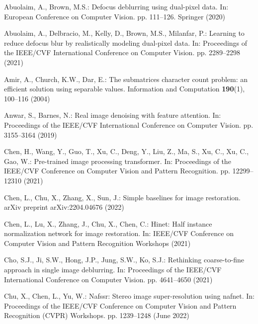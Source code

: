 \documentclass[runningheads]{llncs}
\begin{document}

\begin{thebibliography}{10}
\providecommand{\url}[1]{\texttt{#1}}
\providecommand{\urlprefix}{URL }
\providecommand{\doi}[1]{https://doi.org/#1}

Abuolaim, A., Brown, M.S.: Defocus deblurring using dual-pixel data. In:
  European Conference on Computer Vision. pp. 111--126. Springer (2020)

Abuolaim, A., Delbracio, M., Kelly, D., Brown, M.S., Milanfar, P.: Learning to
  reduce defocus blur by realistically modeling dual-pixel data. In:
  Proceedings of the IEEE/CVF International Conference on Computer Vision. pp.
  2289--2298 (2021)

Amir, A., Church, K.W., Dar, E.: The submatrices character count problem: an
  efficient solution using separable values. Information and Computation
  \textbf{190}(1),  100--116 (2004)

Anwar, S., Barnes, N.: Real image denoising with feature attention. In:
  Proceedings of the IEEE/CVF International Conference on Computer Vision. pp.
  3155--3164 (2019)

Chen, H., Wang, Y., Guo, T., Xu, C., Deng, Y., Liu, Z., Ma, S., Xu, C., Xu, C.,
  Gao, W.: Pre-trained image processing transformer. In: Proceedings of the
  IEEE/CVF Conference on Computer Vision and Pattern Recognition. pp.
  12299--12310 (2021)

Chen, L., Chu, X., Zhang, X., Sun, J.: Simple baselines for image restoration.
  arXiv preprint arXiv:2204.04676  (2022)

Chen, L., Lu, X., Zhang, J., Chu, X., Chen, C.: Hinet: Half instance
  normalization network for image restoration. In: IEEE/CVF Conference on
  Computer Vision and Pattern Recognition Workshops (2021)

Cho, S.J., Ji, S.W., Hong, J.P., Jung, S.W., Ko, S.J.: Rethinking
  coarse-to-fine approach in single image deblurring. In: Proceedings of the
  IEEE/CVF International Conference on Computer Vision. pp. 4641--4650 (2021)

Chu, X., Chen, L., Yu, W.: Nafssr: Stereo image super-resolution using nafnet.
  In: Proceedings of the IEEE/CVF Conference on Computer Vision and Pattern
  Recognition (CVPR) Workshops. pp. 1239--1248 (June 2022)


\end{thebibliography}
\end{document}
